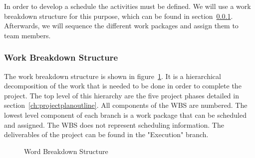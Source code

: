 In order to develop a schedule the activities must be defined. We will use a work breakdown structure for this purpose, which can be found in section~\ref{ch:wbs}. Afterwards, we will sequence the different work packages and assign them to team members.

\subsubsection{Work Breakdown Structure}
\label{ch:wbs}

The work breakdown structure is shown in figure~\ref{fig:wbs}. It is a hierarchical decomposition of the work that is needed to be done in order to complete the project. The top level of this hierarchy are the five project phases detailed in section~\ref{ch:projectplanoutline}. All components of the \ac{WBS} are numbered. The lowest level component of each branch is a work package that can be scheduled and assigned. The \ac{WBS} does not represent scheduling information. The deliverables of the project can be found in the "Execution" branch.

\begin{figure}
  \caption{Word Breakdown Structure}
  \label{fig:wbs}
\end{figure}


